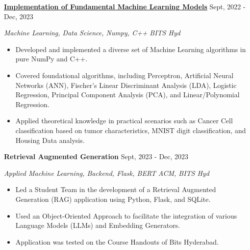 \documentclass[a4paper,12pt]{report}
\newcommand{\marginAdj}{0.5in}
\begin{document}
\noindent 
\textbf{\href{https://github.com/MSSRPRAD/DS-Algorithms}{\color{black}Implementation of Fundamental Machine Learning Models}} \hspace*{1.00in}\hspace*{\marginAdj} {\fontsize{12pt}{12pt}\selectfont Sept, 2022 - Dec, 2023} \par
\noindent
{\fontsize{12pt}{12pt}\selectfont \textit{Machine Learning, Data Science, Numpy, C++}\hfill\textit{ BITS Hyd}} \par
\noindent 
\begin{itemize}[noitemsep,topsep=0pt]
    \item {\fontsize{12pt}{12pt}\selectfont Developed and implemented a diverse set of Machine Learning algorithms in pure NumPy and C++.}  \par
    \item {\fontsize{12pt}{12pt}\selectfont Covered foundational algorithms, including Perceptron, Artificial Neural Networks (ANN), Fischer's Linear Discriminant Analysis (LDA), Logistic Regression, Principal Component Analysis (PCA), and Linear/Polynomial Regression.}  \par
    \item {\fontsize{12pt}{12pt}\selectfont Applied theoretical knowledge in practical scenarios such as Cancer Cell classification based on tumor characteristics, MNIST digit classification, and Housing Data analysis.}  \par
\end{itemize}

\noindent 
\textbf{Retrieval Augmented Generation} \hspace*{2.80in}\hspace*{\marginAdj} {\fontsize{12pt}{12pt}\selectfont Sept, 2023 - Dec, 2023} \par
\noindent
{\fontsize{12pt}{12pt}\selectfont \textit{Applied Machine Learning, Backend, Flask, BERT}\hfill\textit{ ACM, BITS Hyd}} \par
\noindent 
\begin{itemize}[noitemsep,topsep=0pt]
    \item {\fontsize{12pt}{12pt}\selectfont Led a Student Team in the development of a Retrieval Augmented Generation (RAG) application using Python, Flask, and SQLite. } \par
    \item {\fontsize{12pt}{12pt}\selectfont Used an Object-Oriented Approach to facilitate the integration of various Language Models (LLMs) and Embedding Generators. } \par
    \item {\fontsize{12pt}{12pt}\selectfont Application was tested on the Course Handouts of Bits Hyderabad.} \par
\end{itemize}
\end{document}
